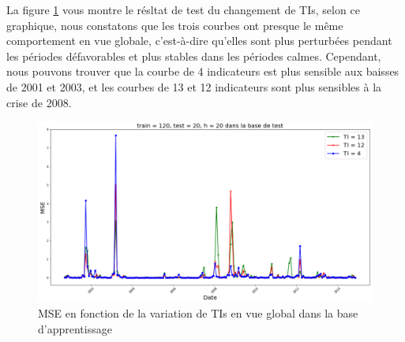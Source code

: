La figure \ref{fig:TI} vous montre le résltat de test du changement de TIs, selon ce graphique, nous constatons que les trois courbes ont presque le même comportement en vue globale, c'est-à-dire qu'elles sont plus perturbées pendant les périodes défavorables et plus stables dans les périodes calmes. Cependant, nous pouvons trouver que la courbe de 4 indicateurs est plus sensible aux baisses de 2001 et 2003, et les courbes de 13 et 12 indicateurs sont plus sensibles à la crise de 2008. 

\begin{figure}[H]
	\centering
	\includegraphics[width=.9\linewidth, scale=0.2]
	{plot/MSE_120_20_20_N_test.png}
	\caption{MSE en fonction de la variation de TIs en vue global dans la base d'apprentissage}
	\label{fig:TI}
\end{figure}




